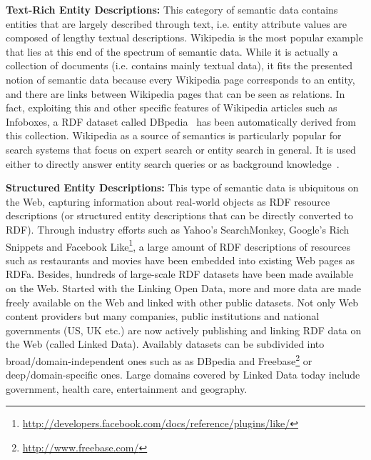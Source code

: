 \textbf{Text-Rich Entity Descriptions:} This category of semantic data contains entities that are largely described through text, i.e. entity attribute values are composed of lengthy textual descriptions. Wikipedia is the most popular example that lies at this end of the spectrum of semantic data. While it is actually a collection of documents (i.e. contains mainly textual data), it fits the presented notion of semantic data because every Wikipedia page corresponds to an entity, and there are links between Wikipedia pages that can be seen as relations. In fact, exploiting this and other specific features of Wikipedia articles such as Infoboxes, a RDF dataset called DBpedia~\cite{DBLP:journals/ws/BizerLKABCH09} has been automatically derived from this collection. Wikipedia as a source of semantics is particularly popular for search systems that focus on expert search or entity search in general. It is used either to directly answer entity search queries or as background knowledge~\cite{DBLP:conf/cikm/KapteinSVK10,DBLP:conf/cikm/BronBR10}. 


\textbf{Structured Entity Descriptions:} This type of semantic data is ubiquitous on the Web, capturing information about real-world objects as RDF resource descriptions (or structured entity descriptions that can be directly converted to RDF). Through industry efforts such as Yahoo's SearchMonkey, Google's Rich Snippets and Facebook Like\footnote{\url{http://developers.facebook.com/docs/reference/plugins/like/}}, a large amount of RDF descriptions of resources such as restaurants and movies have been embedded into existing Web pages as RDFa. Besides, hundreds of large-scale RDF datasets have been made available on the Web. Started with the Linking Open Data, more and more data are made freely available on the Web and linked with other public datasets. Not only Web content providers but many companies, public institutions and national governments (US, UK etc.) are now actively publishing and linking RDF data on the Web (called Linked Data). Availably datasets can be subdivided into broad/domain-independent ones such as as DBpedia and Freebase\footnote{\url{http://www.freebase.com/}} or deep/domain-specific ones. Large domains covered by Linked Data today include government, health care, entertainment and geography.  


